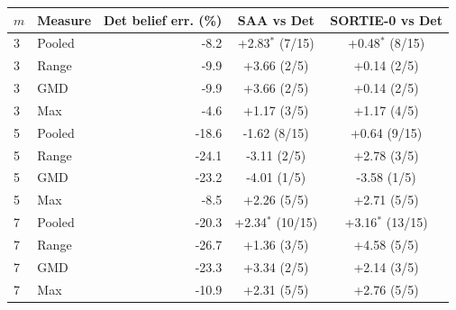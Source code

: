 \begin{tabular}{llrcc}
\toprule
$m$ & Measure & Det belief err. (\%) & SAA vs Det & SORTIE-0 vs Det \\
\midrule
3 & Pooled & -8.2 & +2.83$^\ast$ (7/15) & +0.48$^\ast$ (8/15) \\
3 & Range & -9.9 & +3.66 (2/5) & +0.14 (2/5) \\
3 & GMD & -9.9 & +3.66 (2/5) & +0.14 (2/5) \\
3 & Max & -4.6 & +1.17 (3/5) & +1.17 (4/5) \\
5 & Pooled & -18.6 & -1.62 (8/15) & +0.64 (9/15) \\
5 & Range & -24.1 & -3.11 (2/5) & +2.78 (3/5) \\
5 & GMD & -23.2 & -4.01 (1/5) & -3.58 (1/5) \\
5 & Max & -8.5 & +2.26 (5/5) & +2.71 (5/5) \\
7 & Pooled & -20.3 & +2.34$^\ast$ (10/15) & +3.16$^\ast$ (13/15) \\
7 & Range & -26.7 & +1.36 (3/5) & +4.58 (5/5) \\
7 & GMD & -23.3 & +3.34 (2/5) & +2.14 (3/5) \\
7 & Max & -10.9 & +2.31 (5/5) & +2.76 (5/5) \\
\bottomrule
\end{tabular}
